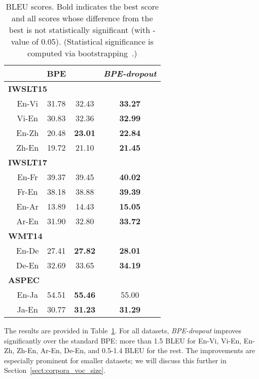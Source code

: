 \documentclass[11pt,a4paper]{article}
\begin{document}
\begin{table}[t!]
\centering
\begin{tabular}{lcccc}
\toprule

 & & BPE  & \citet{sentencepiece} & \textit{BPE-dropout}\\

\midrule
\multicolumn{5}{l}{\!\!\!\bf IWSLT15}\\
&\!\!\!\!\!\! En-Vi & 31{.}78 & 32{.}43 & \bf{33{.}27} \\
&\!\!\!\!\!\! Vi-En & 30{.}83 & 32{.}36 & \bf{32{.}99} \\
&\!\!\!\!\!\! En-Zh & 20.48 & \bf{23.01}  & \bf{22.84} \\
&\!\!\!\!\!\! Zh-En & 19.72 & 21.10 & \bf{21.45} \\
\midrule
\multicolumn{5}{l}{\!\!\!\bf IWSLT17}\\
&\!\!\!\!\!\! En-Fr & 39{.}37 &	39{.}45 &	\bf{40{.}02} \\
&\!\!\!\!\!\! Fr-En & 38{.}18 &	38{.}88 &	\bf{39{.}39} \\
&\!\!\!\!\!\! En-Ar & 13.89 & 14.43 & \bf{15.05} \\
&\!\!\!\!\!\! Ar-En & 31.90 & 32.80 & \bf{33.72} \\
\midrule
\multicolumn{5}{l}{\!\!\!\bf WMT14}\\
&\!\!\!\!\!\! En-De & 27.41 & \bf{27.82} & \bf{28.01}  \\
&\!\!\!\!\!\! De-En & 32.69 & 33.65 & \bf{34.19}\\
\midrule
\multicolumn{5}{l}{\!\!\!\bf ASPEC}\\
&\!\!\!\!\!\! En-Ja & 54.51 & \bf{55.46} & 55.00 \\
&\!\!\!\!\!\! Ja-En & 30.77 & \bf{31.23} & \bf{31.29} \\

\bottomrule
\end{tabular}
\caption{BLEU scores. Bold indicates the best score and all scores whose difference from the best is not statistically significant (with -value of 0.05). (Statistical significance is computed via bootstrapping~\cite{koehn2004statistical}.)}
\label{tab:main}
\end{table}


The results are provided in Table~\ref{tab:main}.
For all datasets, \textit{BPE-dropout} improves
significantly over the standard BPE: more than 1{.}5 BLEU for En-Vi, Vi-En, En-Zh, Zh-En, Ar-En, De-En,  and 0{.}5-1{.}4 BLEU for the rest. The improvements are especially prominent for smaller datasets; we will discuss this further in Section~\ref{sect:corpora_voc_size}.
\end{document}
